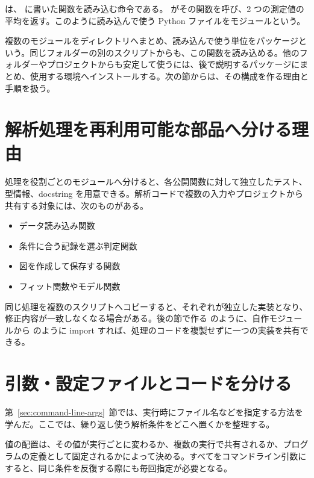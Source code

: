  は、 に書いた関数を読み込む命令である。 がその関数を呼び、2 つの測定値の平均を返す。このように読み込んで使う Python ファイルをモジュールという。

複数のモジュールをディレクトリへまとめ、読み込んで使う単位をパッケージという。同じフォルダーの別のスクリプトからも、この関数を読み込める。他のフォルダーやプロジェクトからも安定して使うには、後で説明するパッケージにまとめ、使用する環境へインストールする。次の節からは、その構成を作る理由と手順を扱う。

\section{解析処理を再利用可能な部品へ分ける理由}

処理を役割ごとのモジュールへ分けると、各公開関数に対して独立したテスト、型情報、docstring を用意できる。解析コードで複数の入力やプロジェクトから共有する対象には、次のものがある。

\begin{itemize}
\item データ読み込み関数
\item 条件に合う記録を選ぶ判定関数
\item 図を作成して保存する関数
\item フィット関数やモデル関数
\end{itemize}

同じ処理を複数のスクリプトへコピーすると、それぞれが独立した実装となり、修正内容が一致しなくなる場合がある。後の節で作る  のように、自作モジュールから  のように import すれば、処理のコードを複製せずに一つの実装を共有できる。

\section{引数・設定ファイルとコードを分ける}

第~\ref{sec:command-line-args}~節では、実行時にファイル名などを指定する方法を学んだ。ここでは、繰り返し使う解析条件をどこへ置くかを整理する。

値の配置は、その値が実行ごとに変わるか、複数の実行で共有されるか、プログラムの定義として固定されるかによって決める。すべてをコマンドライン引数にすると、同じ条件を反復する際にも毎回指定が必要となる。

